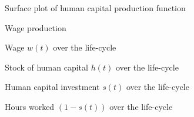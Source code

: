 \begin{frame}\begin{figure}[htp]\centering
\caption{Surface plot of human capital production function}
\end{figure}\end{frame}

\begin{frame}\begin{figure}[htp]\centering
\caption{Wage production}
\end{figure}\end{frame}

\begin{frame}\begin{figure}[htp]\centering
\caption{Wage $w(t)$ over the life-cycle}
\end{figure}\end{frame}

\begin{frame}\begin{figure}[htp]\centering
\caption{Stock of human capital $h(t)$ over the life-cycle}
\end{figure}\end{frame}

\begin{frame}\begin{figure}[htp]\centering
\caption{Human capital investment $s(t)$ over the life-cycle}
\end{figure}\end{frame}

\begin{frame}\begin{figure}[htp]\centering
\caption{Hours worked $(1 - s(t))$ over the life-cycle}
\end{figure}\end{frame}

